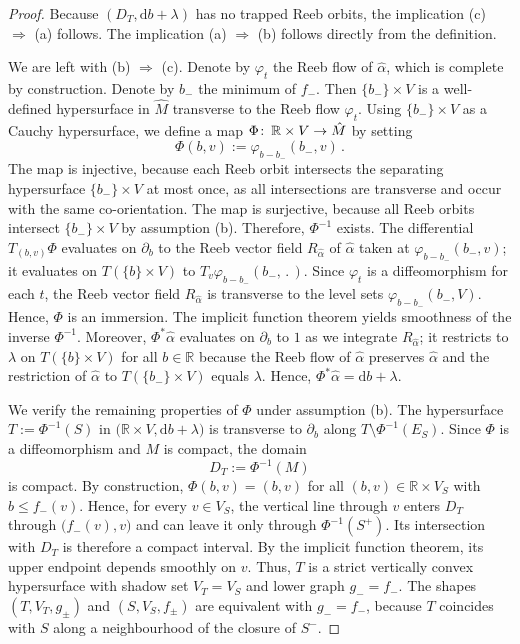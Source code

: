 \documentclass[10pt,a4paper]{amsart}
\newcommand{\R}{\mathbb R}
\def\co{\colon\thinspace}
\newcommand{\ra}{\rightarrow}
\newcommand{\rmd}{\mathrm d}
\begin{document}
\begin{proof}
  Because $(D_T,\rmd b+\lambda)$
  has no trapped Reeb orbits,
  the implication (c) $\Rightarrow$ (a) follows.
  The implication (a) $\Rightarrow$ (b)
  follows directly from the definition. 
  
  We are left with (b) $\Rightarrow$ (c).
  Denote by $\varphi_t$ the Reeb flow of $\hat{\alpha}$,
  which is complete by construction.
  Denote by $b_-$ the minimum of $f_-$.
  Then $\{b_-\}\times V$ is a well-defined
  hypersurface in $\hat{M}$ transverse
  to the Reeb flow $\varphi_t$.
  Using $\{b_-\}\times V$ as a Cauchy hypersurface,
  we define a map $\Phi\co\R\times V\ra\hat{M}$ by setting
  \[
    \Phi(b,v):=\varphi_{b-b_-}(b_-,v)
    \,.
  \]
  The map is injective,
  because each Reeb orbit intersects
  the separating hypersurface $\{b_-\}\times V$ at most once,
  as all intersections are transverse and
  occur with the same co-orientation.
  The map is surjective,
  because all Reeb orbits intersect $\{b_-\}\times V$
  by assumption (b).
  Therefore, $\Phi^{-1}$ exists.
  The differential $T_{(b,v)}\Phi$ evaluates on $\partial_b$ to
  the Reeb vector field $R_{\hat{\alpha}}$ of $\hat{\alpha}$
  taken at $\varphi_{b-b_-}(b_-,v)$;
  it evaluates on $T(\{b\}\times V)$ to $T_v\varphi_{b-b_-}(b_-,\,.\,)$. 
  Since $\varphi_t$ is a diffeomorphism for each $t$,
  the Reeb vector field $R_{\hat{\alpha}}$ is transverse
  to the level sets $\varphi_{b-b_-}(b_-,V)$.
  Hence, $\Phi$ is an immersion.
  The implicit function theorem yields smoothness
  of the inverse $\Phi^{-1}$.
  Moreover,
  $\Phi^*\hat{\alpha}$ evaluates on $\partial_b$ to $1$
  as we integrate $R_{\hat{\alpha}}$;
  it restricts to $\lambda$ on $T(\{b\}\times V)$ for all $b\in\R$
  because the Reeb flow of $\hat{\alpha}$ preserves $\hat{\alpha}$
  and the restriction of $\hat{\alpha}$ to $T(\{b_-\}\times V)$
  equals $\lambda$.
  Hence, $\Phi^*\hat{\alpha}=\rmd b+\lambda$.
    
  We verify the remaining properties of $\Phi$ under assumption (b).
  The hypersurface $T:=\Phi^{-1}(S)$
  in $\big(\R\times V,\rmd b+\lambda\big)$
  is transverse to $\partial_b$ along $T\setminus\Phi^{-1}(E_S)$.
  Since $\Phi$ is a diffeomorphism and $M$ is compact,
  the domain
  \[
  D_T:=\Phi^{-1}(M)
  \]
  is compact.
  By construction,
  $\Phi(b,v)=(b,v)$ for all $(b,v)\in\R\times V_S$
  with $b\leq f_-(v)$.
  Hence, for every $v\in V_S$,
  the vertical line through $v$ enters $D_T$
  through $\big(f_-(v),v\big)$
  and can leave it only through $\Phi^{-1}(S^+)$.
  Its intersection with $D_T$ is therefore a compact interval.
  By the implicit function theorem,
  its upper endpoint depends smoothly on $v$.
  Thus, $T$ is a strict vertically convex hypersurface
  with shadow set $V_T=V_S$ and lower graph $g_-=f_-$.
  The shapes $(T,V_T,g_{\pm})$ and $(S,V_S,f_{\pm})$
  are equivalent with $g_-=f_-$,
  because $T$ coincides with $S$
  along a neighbourhood of the closure of $S^-$.
  

\end{proof}
\end{document}

